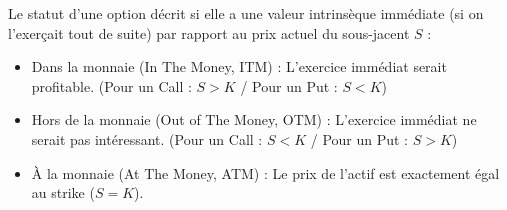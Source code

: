 \begin{definitionbox}
Le statut d'une option décrit si elle a une valeur intrinsèque immédiate (si on l'exerçait tout de suite) par rapport au prix actuel du sous-jacent $S$ :
\begin{itemize}[label=$\cdot$]
    \item Dans la monnaie (In The Money, ITM) : L'exercice immédiat serait profitable.
        (Pour un Call : $S > K$ / Pour un Put : $S < K$)
    \item Hors de la monnaie (Out of The Money, OTM) : L'exercice immédiat ne serait pas intéressant.
        (Pour un Call : $S < K$ / Pour un Put : $S > K$)
    \item À la monnaie (At The Money, ATM) : Le prix de l'actif est exactement égal au strike ($S = K$).
\end{itemize}
\end{definitionbox}

\vspace{0.5cm}
\begin{center}
\end{center}
\vspace{0.5cm}